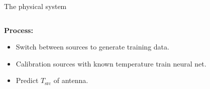\documentclass[aspectratio=169]{beamer}
\begin{document}
\begin{frame}{\small{The physical system}}
	\begin{columns}
		\begin{column}{0.3\textwidth}
			\textbf{Process:}
			\begin{itemize}
				\item Switch between sources to generate training data.
				\item Calibration sources with known temperature train neural net.
				\item Predict $T_{\text{src}}$ of antenna.
			\end{itemize}
		\end{column}

		\begin{column}{0.7\textwidth}
			\begin{figure}
				\centering
				
			\end{figure}
		\end{column}
	\end{columns}
	\vfill
\end{frame}
\end{document}
